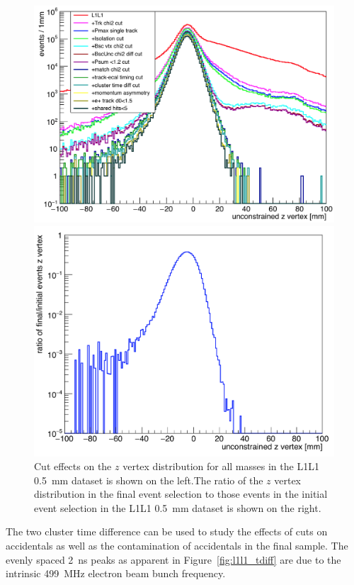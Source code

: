 \begin{figure}[hbt]
\begin{minipage}{0.5\textwidth}
\includegraphics[width=\textwidth]{pics/searching/L1L1_zvtx.png}
\end{minipage}\hfill\begin{minipage}{0.5\textwidth}
 \includegraphics[width=\textwidth]{pics/searching/ratio_zvtx_cuts.png}
 \end{minipage}
 \caption[Cut effects on the $z$ vertex distribution]{Cut effects on the $z$ vertex distribution for all masses in the L1L1 0.5~mm dataset is shown on the left.The ratio of the $z$ vertex distribution in the final event selection to those events in the initial event selection in the L1L1 0.5~mm dataset is shown on the right.}
  \label{fig:l1l1_vtx}
\end{figure}
The two cluster time difference can be used to study the effects of cuts on accidentals as well as the contamination of accidentals in the final sample. The evenly spaced 2~ns peaks as apparent in Figure~\ref{fig:l1l1_tdiff} are due to the intrinsic 499~MHz electron beam bunch frequency.

